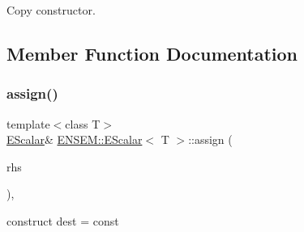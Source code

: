 Copy constructor. 



\subsection{Member Function Documentation}
\mbox{\label{classENSEM_1_1EScalar_a9b88ad4d69d05f69b6483701487ddb74}} 
\subsubsection{\texorpdfstring{assign()}{assign()}\hspace{0.1cm}{\footnotesize\ttfamily [1/9]}}
{\footnotesize\ttfamily template$<$class T$>$ \\
\mbox{\hyperlink{classENSEM_1_1EScalar}{E\+Scalar}}\& \mbox{\hyperlink{classENSEM_1_1EScalar}{E\+N\+S\+E\+M\+::\+E\+Scalar}}$<$ T $>$\+::assign (\begin{DoxyParamCaption}\item[{const typename \mbox{\hyperlink{structENSEM_1_1WordType}{Word\+Type}}$<$ T $>$\+::Type\+\_\+t \&}]{rhs }\end{DoxyParamCaption})\hspace{0.3cm}{\ttfamily [inline]}, {\ttfamily [protected]}}



construct dest = const 

